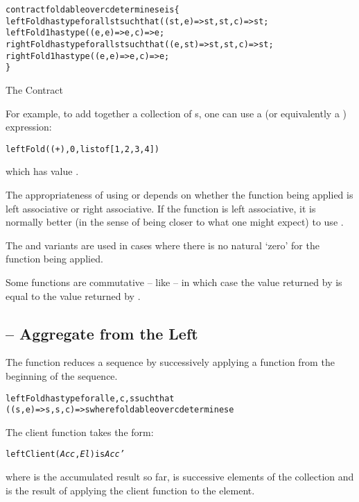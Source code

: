 \begin{program}[H]
\begin{alltt}
contract foldable over c determines e is \{
  leftFold has type for all st such that ((st,e)=>st,st,c)=>st;
  leftFold1 has type ((e,e)=>e,c) => e;
  rightFold has type for all st such that ((e,st)=>st,st,c)=>st;
  rightFold1 has type ((e,e)=>e,c)=>e;
\}
\end{alltt}
\caption{The  Contract\label{foldableContractProg}}
\end{program}

For example, to add together a collection of s, one can use a  (or equivalently a ) expression:
\begin{alltt}
leftFold((+),0,list of [1, 2, 3, 4])
\end{alltt}
which has value .

\begin{aside}
The appropriateness of using  or  depends on whether the function being applied is left associative or right associative. If the function is left associative, it is normally better (in the sense of being closer to what one might expect) to use .

The  and  variants are used in cases where there is no natural `zero' for the function being applied.

Some functions are commutative -- like \q{(+)} -- in which case the value returned by  is equal to the value returned by .
\end{aside}

\subsection{ -- Aggregate from the Left}
\label{leftFold}
The  function reduces a sequence by successively applying a function from the beginning of the sequence.
\begin{alltt}
leftFold has type for all e,c,s such that
    ((s,e)=>s,s,c) => s where foldable over c determines e
\end{alltt}
The client function takes the form:
\begin{alltt}
leftClient(\emph{Acc},\emph{El}) is \emph{Acc'}
\end{alltt}
where  is the accumulated result so far,  is successive elements of the collection and  is the result of applying the client function to the element.

